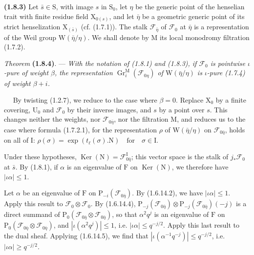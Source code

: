 \documentclass[11pt,leqno]{article}
\newcommand{\Page}[1]{\ifvmode\noindent\else\unskip\ \fi{\footnotesize\textcolor{gray}{[p.\,#1]}}\ \ignorespaces}
\begin{document}
\textbf{(1.8.3)} Let \(\bar{s}\in\mathrm{S}\), with image \(s\) in \(\mathrm{S}_0\), let \(\eta\) be the generic point of the henselian trait with finite residue field \(\mathrm{X}_{0(s)}\), and let \(\bar{\eta}\) be a geometric generic point of its strict henselization \(\mathrm{X}_{(\bar{s})}\) (cf. (1.7.1)). The stalk \(\mathscr{F}_{\bar{\eta}}\) of \(\mathscr{F}_0\) at \(\bar{\eta}\) is a representation of the Weil group \(\mathrm{W}(\bar{\eta}/\eta)\). We shall denote by \(\mathrm{M}\) its local monodromy filtration (1.7.2).

\textit{Theorem} \textbf{(1.8.4)}. — \textit{With the notation of \textup{(1.8.1)} and \textup{(1.8.3)}, if \(\mathscr{F}_0\) is pointwise \(\iota\)-pure of weight \(\beta\), the representation \(\operatorname{Gr}_i^{\mathrm{M}}(\mathscr{F}_{0\eta})\) of \(\mathrm{W}(\bar{\eta}/\eta)\) is \(\iota\)-pure \textup{(1.7.4)} of weight \(\beta+i\).}

\Page{176}
By twisting (1.2.7), we reduce to the case where \(\beta=0\). Replace \(\mathrm{X}_0\) by a finite covering, \(\mathrm{U}_0\) and \(\mathscr{F}_0\) by their inverse images, and \(s\) by a point over \(s\). This changes neither the weights, nor \(\mathscr{F}_{0\bar{\eta}}\), nor the filtration \(\mathrm{M}\), and reduces us to the case where formula (1.7.2.1), for the representation \(\rho\) of \(\mathrm{W}(\bar{\eta}/\eta)\) on \(\mathscr{F}_{0\bar{\eta}}\), holds on all of \(\mathrm{I}\):
\(\rho(\sigma)=\exp(t_\ell(\sigma).\mathrm{N})\quad\text{for}\quad\sigma\in\mathrm{I}\).

Under these hypotheses, \(\operatorname{Ker}(\mathrm{N})=\mathscr{F}_{0\bar{\eta}}^{\mathrm{I}}\); this vector space is the stalk of \(j_*\mathscr{F}_0\) at \(\bar{s}\). By (1.8.1), if \(\alpha\) is an eigenvalue of \(\mathrm{F}\) on \(\operatorname{Ker}(\mathrm{N})\), we therefore have \(|\iota\alpha|\leq1\).

Let \(\alpha\) be an eigenvalue of \(\mathrm{F}\) on \(\mathrm{P}_{-i}(\mathscr{F}_{0\bar{\eta}})\). By (1.6.14.2), we have \(|\iota\alpha|\leq1\). Apply this result to \(\mathscr{F}_0\otimes\mathscr{F}_0\). By (1.6.14.4), \(\mathrm{P}_{-j}(\mathscr{F}_{0\bar{\eta}})\otimes\mathrm{P}_{-j}(\mathscr{F}_{0\bar{\eta}})(-j)\) is a direct summand of \(\mathrm{P}_0(\mathscr{F}_{0\bar{\eta}}\otimes\mathscr{F}_{0\bar{\eta}})\), so that \(\alpha^2q^j\) is an eigenvalue of \(\mathrm{F}\) on \(\mathrm{P}_0(\mathscr{F}_{0\bar{\eta}}\otimes\mathscr{F}_{0\bar{\eta}})\), and \(|\iota(\alpha^2q^j)|\leq1\), i.e. \(|\iota\alpha|\leq q^{-j/2}\). Apply this last result to the dual sheaf. Applying (1.6.14.5), we find that \(|\iota(\alpha^{-1}q^{-j})|\leq q^{-j/2}\), i.e. \(|\iota\alpha|\geq q^{-j/2}\).
\end{document}

